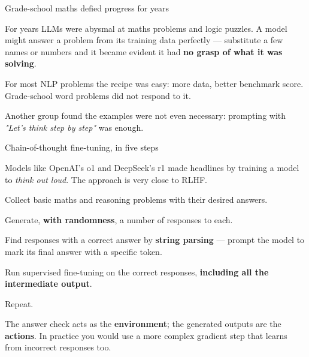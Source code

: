 \documentclass[aspectratio=169,11pt,t]{beamer}
\begin{document}
\begin{frame}[shrink=25]{Grade-school maths defied progress for years}
{\fontsize{9.4}{12.6}\selectfont\color{fg2}For years LLMs were abysmal at maths problems and logic puzzles. A model might answer a problem from its training data perfectly --- substitute a few names or numbers and it became evident it had \textbf{no grasp of what it was solving}.\par}\vskip 4pt
{\fontsize{9.4}{12.6}\selectfont\color{fg2}For most NLP problems the recipe was easy: more data, better benchmark score. Grade-school word problems did not respond to it.\par}\vskip 4pt
\begin{iquote}
\end{iquote}
{\fontsize{9.4}{12.6}\selectfont\color{fg2}Another group found the examples were not even necessary: prompting with \textit{"Let's think step by step"} was enough.\par}\vskip 4pt
\end{frame}

\begin{frame}[shrink=25]{Chain-of-thought fine-tuning, in five steps}
{\fontsize{9.4}{12.6}\selectfont\color{fg2}Models like OpenAI's o1 and DeepSeek's r1 made headlines by training a model to \textit{think out loud}. The approach is very close to RLHF.\par}\vskip 4pt
\begin{isteps}
\item Collect basic maths and reasoning problems with their desired answers.
\item Generate, \textbf{with randomness}, a number of responses to each.
\item Find responses with a correct answer by \textbf{string parsing} --- prompt the model to mark its final answer with a specific token.
\item Run supervised fine-tuning on the correct responses, \textbf{including all the intermediate output}.
\item Repeat.
\end{isteps}
{\fontsize{9.4}{12.6}\selectfont\color{fg2}The answer check acts as the \textbf{environment}; the generated outputs are the \textbf{actions}. In practice you would use a more complex gradient step that learns from incorrect responses too.\par}\vskip 4pt
\end{frame}
\end{document}
